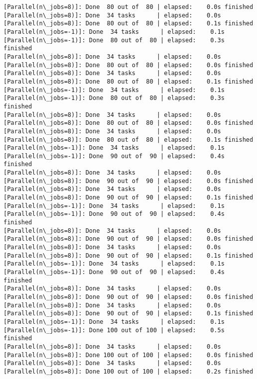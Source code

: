 \documentclass[11pt]{article}
\begin{document}
\begin{Verbatim}[commandchars=\\\{\}]
[Parallel(n\_jobs=8)]: Done  80 out of  80 | elapsed:    0.0s finished
[Parallel(n\_jobs=8)]: Done  34 tasks      | elapsed:    0.0s
[Parallel(n\_jobs=8)]: Done  80 out of  80 | elapsed:    0.1s finished
[Parallel(n\_jobs=-1)]: Done  34 tasks      | elapsed:    0.1s
[Parallel(n\_jobs=-1)]: Done  80 out of  80 | elapsed:    0.3s finished
[Parallel(n\_jobs=8)]: Done  34 tasks      | elapsed:    0.0s
[Parallel(n\_jobs=8)]: Done  80 out of  80 | elapsed:    0.0s finished
[Parallel(n\_jobs=8)]: Done  34 tasks      | elapsed:    0.0s
[Parallel(n\_jobs=8)]: Done  80 out of  80 | elapsed:    0.1s finished
[Parallel(n\_jobs=-1)]: Done  34 tasks      | elapsed:    0.1s
[Parallel(n\_jobs=-1)]: Done  80 out of  80 | elapsed:    0.3s finished
[Parallel(n\_jobs=8)]: Done  34 tasks      | elapsed:    0.0s
[Parallel(n\_jobs=8)]: Done  80 out of  80 | elapsed:    0.0s finished
[Parallel(n\_jobs=8)]: Done  34 tasks      | elapsed:    0.0s
[Parallel(n\_jobs=8)]: Done  80 out of  80 | elapsed:    0.1s finished
[Parallel(n\_jobs=-1)]: Done  34 tasks      | elapsed:    0.1s
[Parallel(n\_jobs=-1)]: Done  90 out of  90 | elapsed:    0.4s finished
[Parallel(n\_jobs=8)]: Done  34 tasks      | elapsed:    0.0s
[Parallel(n\_jobs=8)]: Done  90 out of  90 | elapsed:    0.0s finished
[Parallel(n\_jobs=8)]: Done  34 tasks      | elapsed:    0.0s
[Parallel(n\_jobs=8)]: Done  90 out of  90 | elapsed:    0.1s finished
[Parallel(n\_jobs=-1)]: Done  34 tasks      | elapsed:    0.1s
[Parallel(n\_jobs=-1)]: Done  90 out of  90 | elapsed:    0.4s finished
[Parallel(n\_jobs=8)]: Done  34 tasks      | elapsed:    0.0s
[Parallel(n\_jobs=8)]: Done  90 out of  90 | elapsed:    0.0s finished
[Parallel(n\_jobs=8)]: Done  34 tasks      | elapsed:    0.0s
[Parallel(n\_jobs=8)]: Done  90 out of  90 | elapsed:    0.1s finished
[Parallel(n\_jobs=-1)]: Done  34 tasks      | elapsed:    0.1s
[Parallel(n\_jobs=-1)]: Done  90 out of  90 | elapsed:    0.4s finished
[Parallel(n\_jobs=8)]: Done  34 tasks      | elapsed:    0.0s
[Parallel(n\_jobs=8)]: Done  90 out of  90 | elapsed:    0.0s finished
[Parallel(n\_jobs=8)]: Done  34 tasks      | elapsed:    0.0s
[Parallel(n\_jobs=8)]: Done  90 out of  90 | elapsed:    0.1s finished
[Parallel(n\_jobs=-1)]: Done  34 tasks      | elapsed:    0.1s
[Parallel(n\_jobs=-1)]: Done 100 out of 100 | elapsed:    0.5s finished
[Parallel(n\_jobs=8)]: Done  34 tasks      | elapsed:    0.0s
[Parallel(n\_jobs=8)]: Done 100 out of 100 | elapsed:    0.0s finished
[Parallel(n\_jobs=8)]: Done  34 tasks      | elapsed:    0.0s
[Parallel(n\_jobs=8)]: Done 100 out of 100 | elapsed:    0.2s finished

\end{Verbatim}
\end{document}
